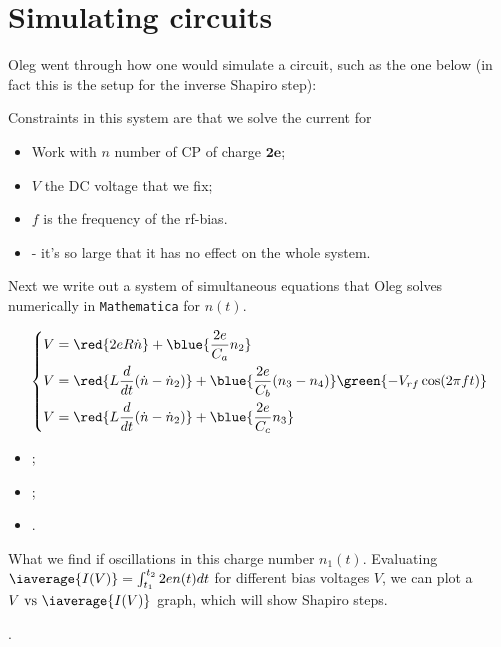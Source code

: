 \newpage
\section{Simulating circuits \label{sec:simulating_circuits}}
 Oleg went through how one would simulate a circuit, such as the one below (in fact this is the setup for the inverse Shapiro step):
 
 
 \noindent Constraints in this system are that we solve the current for
 \begin{itemize}
 	\item Work with $ n $ \hfill number of CP of charge $ \mathbf{2e} $;
 	\item $ V $ \hfill the DC voltage that we fix;
 	\item $f$ \hfill is the frequency of the rf-bias.
 	\item {} - it's so large that it has no effect on the whole system.
 \end{itemize}
 
 \noindent Next we write out a system of simultaneous equations that Oleg solves numerically in \verb|Mathematica| for $ n(t) $.
 
 \begin{equation}\label{key}
 	\left\lbrace\begin{aligned}
 		V & = \red{2eR\dot{n}} + \blue{\frac{2e}{C_a}n_2}\\
 		V & = \red{L\frac{d}{dt}(\dot{n}-\dot{n}_2)} + \blue{\frac{2e}{C_b}(n_3 - n_4)}  \green{- V_{rf}\cos(2\pi ft)}\\
		V & = \red{L\frac{d}{dt}(\dot{n}-\dot{n}_2)} + \blue{\frac{2e}{C_c}n_3}
 	\end{aligned}\right.
 \end{equation}
 \begin{itemize}
 		\item {};
 		\item {};
 		\item {}.
 \end{itemize}
 
 \noindent What we find if oscillations in this charge number $ n_1(t) $. Evaluating $ \iaverage{I(V)} = \int_{t_1}^{t_2}2e n(t)dt $ for different bias voltages $ V $, we can plot a $ V \text{ vs } \iaverage{I(V)} $ graph, which will show Shapiro steps.
 
 .
